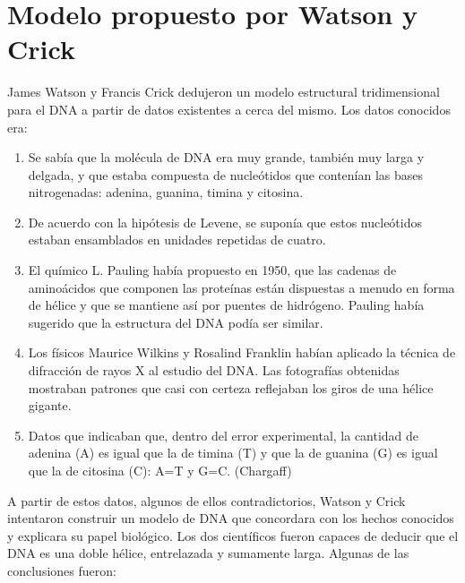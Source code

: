 \chapter{Modelo propuesto por Watson y Crick}
\label{modelo}

James Watson y Francis Crick dedujeron un modelo estructural tridimensional para el DNA a partir de datos existentes a cerca del mismo. 
Los datos conocidos era:
\begin{enumerate}
	\item Se sabía que la molécula de DNA era muy grande, también muy larga y delgada, y que estaba compuesta de nucleótidos que contenían las bases 				nitrogenadas: adenina, guanina, timina y citosina.
	\item De acuerdo con la hipótesis de Levene, se suponía que estos nucleótidos estaban ensamblados en unidades repetidas de cuatro.
	\item El químico L. Pauling había propuesto en 1950, que las cadenas de aminoácidos que componen las proteínas están dispuestas a menudo en forma
			de hélice y que se mantiene así por puentes de hidrógeno. Pauling había sugerido que la estructura del DNA podía ser similar.
	\item Los físicos Maurice Wilkins y Rosalind Franklin habían aplicado la técnica de difracción de rayos X al estudio del DNA. Las fotografías 				obtenidas mostraban patrones que casi con certeza reflejaban los giros de una hélice gigante.
	\item  Datos que indicaban que, dentro del error experimental, la cantidad de adenina (A) es igual que la de timina (T) y que la de guanina (G) es 				igual que la de citosina (C): A=T y G=C. (Chargaff)
\end{enumerate}
A partir de estos datos, algunos de ellos contradictorios, Watson y Crick intentaron construir un modelo de DNA que concordara con los hechos conocidos y explicara su papel biológico. Los dos científicos fueron capaces de deducir que el DNA es una doble hélice, entrelazada y sumamente larga.
Algunas de las conclusiones fueron:

